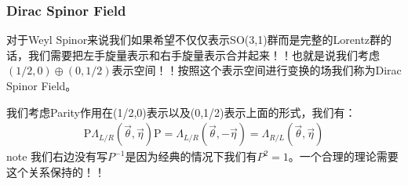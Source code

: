     \subsubsection{Dirac Spinor Field}

    对于Weyl
    Spinor来说我们如果希望不仅仅表示SO(3,1)群而是完整的Lorentz群的话，我们需要把左手旋量表示和右手旋量表示合并起来！！也就是说我们考虑$
    (1/2,0) \oplus (0,1/2) $表示空间！！按照这个表示空间进行变换的场我们称为Dirac Spinor Field。

    \bigskip

    我们考虑Parity作用在(1/2,0)表示以及(0,1/2)表示上面的形式，我们有：
    \begin{align}
      \mathrm{P}\Lambda_{L/R}(\vec{\theta},\vec{\eta})\mathrm{P}=\Lambda_{L/R}(\vec{\theta},-\vec{\eta})
      = \Lambda_{R/L}(\vec{\theta},\vec{\eta})
    \end{align}
    note 我们右边没有写$ P^{-1} $是因为经典的情况下我们有$ P^2=1 $。一个合理的理论需要这个关系保持的！！

    \bigskip

